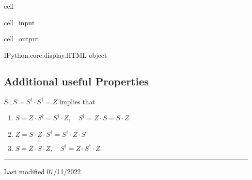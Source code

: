 \documentclass[letterpaper,10pt,english]{jupyterBook}
\begin{document}
\begin{sphinxuseclass}{cell}\begin{sphinxVerbatimInput}

\begin{sphinxuseclass}{cell_input}
\begin{sphinxVerbatim}[commandchars=\\\{\}]
\end{sphinxVerbatim}

\end{sphinxuseclass}\end{sphinxVerbatimInput}
\begin{sphinxVerbatimOutput}

\begin{sphinxuseclass}{cell_output}
\begin{sphinxVerbatim}[commandchars=\\\{\}]
\PYGZlt{}IPython.core.display.HTML object\PYGZgt{}
\end{sphinxVerbatim}

\end{sphinxuseclass}\end{sphinxVerbatimOutput}

\end{sphinxuseclass}

\subsection{Additional useful Properties}
\label{\detokenize{q1gates/s:additional-useful-properties}}
\sphinxAtStartPar
\(S \cdot, S = S^\dagger \cdot S^\dagger = Z\) implies that
\begin{enumerate}
%
\item {}
\sphinxAtStartPar
\(S = Z \cdot S^\dagger = S^\dagger \cdot Z, \quad S^\dagger = Z \cdot S = S  \cdot Z\).

\item {}
\sphinxAtStartPar
\(Z = S \cdot Z \cdot  S^\dagger = S^\dagger \cdot Z \cdot S\)

\item {}
\sphinxAtStartPar
\(S = Z \cdot S \cdot Z, \quad S^\dagger = Z \cdot S^\dagger \cdot Z\).

\end{enumerate}


\bigskip\hrule\bigskip


\sphinxAtStartPar
Last modified 07/11/2022

\sphinxstepscope
\end{document}
